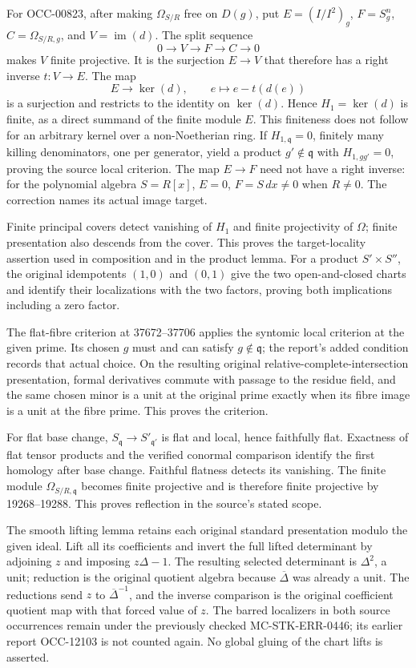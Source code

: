 For OCC-00823, after making \(\Omega_{S/R}\) free on \(D(g)\), put \(E=(I/I^2)_g\), \(F=S_g^n\), \(C=\Omega_{S/R,g}\), and \(V=\operatorname{im}(d)\). The split sequence \[
0\longrightarrow V\longrightarrow F\longrightarrow C\longrightarrow0
\] makes \(V\) finite projective. It is the surjection \(E\to V\) that therefore has a right inverse \(t:V\to E\). The map \[
E\longrightarrow\ker(d),\qquad e\longmapsto e-t(d(e))
\] is a surjection and restricts to the identity on \(\ker(d)\). Hence \(H_1=\ker(d)\) is finite, as a direct summand of the finite module \(E\). This finiteness does not follow for an arbitrary kernel over a non-Noetherian ring. If \(H_{1,\mathfrak q}=0\), finitely many killing denominators, one per generator, yield a product \(g'\notin\mathfrak q\) with \(H_{1,gg'}=0\), proving the source local criterion. The map \(E\to F\) need not have a right inverse: for the polynomial algebra \(S=R[x]\), \(E=0\), \(F=S\,dx\ne0\) when \(R\ne0\). The correction names its actual image target.

Finite principal covers detect vanishing of \(H_1\) and finite projectivity of \(\Omega\); finite presentation also descends from the cover. This proves the target-locality assertion used in composition and in the product lemma. For a product \(S'\times S''\), the original idempotents \((1,0)\) and \((0,1)\) give the two open-and-closed charts and identify their localizations with the two factors, proving both implications including a zero factor.

The flat-fibre criterion at 37672--37706 applies the syntomic local criterion at the given prime. Its chosen \(g\) must and can satisfy \(g\notin\mathfrak q\); the report's added condition records that actual choice. On the resulting original relative-complete-intersection presentation, formal derivatives commute with passage to the residue field, and the same chosen minor is a unit at the original prime exactly when its fibre image is a unit at the fibre prime. This proves the criterion.

For flat base change, \(S_{\mathfrak q}\to S'_{\mathfrak q'}\) is flat and local, hence faithfully flat. Exactness of flat tensor products and the verified conormal comparison identify the first homology after base change. Faithful flatness detects its vanishing. The finite module \(\Omega_{S/R,\mathfrak q}\) becomes finite projective and is therefore finite projective by 19268--19288. This proves reflection in the source's stated scope.

The smooth lifting lemma retains each original standard presentation modulo the given ideal. Lift all its coefficients and invert the full lifted determinant by adjoining \(z\) and imposing \(z\Delta-1\). The resulting selected determinant is \(\Delta^2\), a unit; reduction is the original quotient algebra because \(\overline\Delta\) was already a unit. The reductions send \(z\) to \(\overline\Delta^{-1}\), and the inverse comparison is the original coefficient quotient map with that forced value of \(z\). The barred localizers in both source occurrences remain under the previously checked MC-STK-ERR-0446; its earlier report OCC-12103 is not counted again. No global gluing of the chart lifts is asserted.

